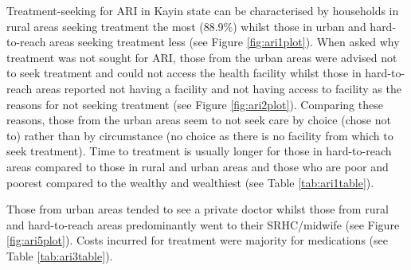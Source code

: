 \documentclass[12pt,a4paper]{article}
\begin{document}
Treatment-seeking for ARI in Kayin state can be characterised by households in rural areas seeking treatment the most (88.9\%) whilst those in urban and hard-to-reach areas seeking treatment less (see Figure \ref{fig:ari1plot}). When asked why treatment was not sought for ARI, those from the urban areas were advised not to seek treatment and could not access the health facility whilst those in hard-to-reach areas reported not having a facility and not having access to facility as the reasons for not seeking treatment (see Figure \ref{fig:ari2plot}). Comparing these reasons, those from the urban areas seem to not seek care by choice (chose not to) rather than by circumstance (no choice as there is no facility from which to seek treatment). Time to treatment is usually longer for those in hard-to-reach areas compared to those in rural and urban areas and those who are poor and poorest compared to the wealthy and wealthiest (see Table \ref{tab:ari1table}).

Those from urban areas tended to see a private doctor whilst those from rural and hard-to-reach areas predominantly went to their SRHC/midwife (see Figure \ref{fig:ari5plot}). Costs incurred for treatment were majority for medications (see Table \ref{tab:ari3table}).
\end{document}
